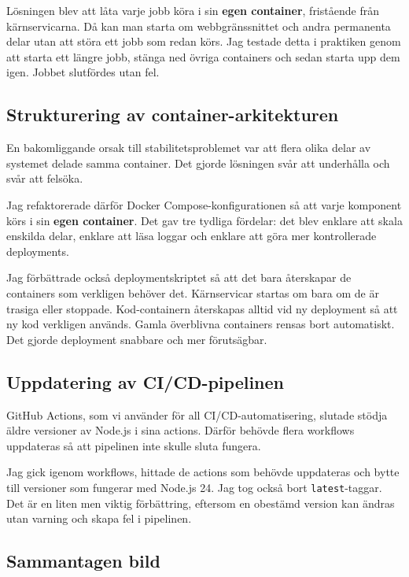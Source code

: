 Lösningen blev att låta varje jobb köra i sin \textbf{egen container}, fristående från
kärnservicarna. Då kan man starta om webbgränssnittet och andra permanenta delar utan att
störa ett jobb som redan körs. Jag testade detta i praktiken genom att starta ett längre jobb,
stänga ned övriga containers och sedan starta upp dem igen. Jobbet slutfördes utan fel.

\subsection{Strukturering av container-arkitekturen}
\label{subsec:compose}

En bakomliggande orsak till stabilitetsproblemet var att flera olika delar av systemet delade
samma container. Det gjorde lösningen svår att underhålla och svår att felsöka.

Jag refaktorerade därför Docker Compose-konfigurationen så att varje komponent körs i sin
\textbf{egen container}. Det gav tre tydliga fördelar: det blev enklare att skala enskilda delar,
enklare att läsa loggar och enklare att göra mer kontrollerade deployments.

Jag förbättrade också deploymentskriptet så att det bara återskapar de containers som verkligen
behöver det. Kärnservicar startas om bara om de är trasiga eller stoppade. Kod-containern
återskapas alltid vid ny deployment så att ny kod verkligen används. Gamla överblivna
containers rensas bort automatiskt. Det gjorde deployment snabbare och mer förutsägbar.

\subsection{Uppdatering av CI/CD-pipelinen}
\label{subsec:cicd}

GitHub Actions, som vi använder för all CI/CD-automatisering, slutade stödja äldre versioner
av Node.js i sina actions. Därför behövde flera workflows uppdateras så att pipelinen inte
skulle sluta fungera.

Jag gick igenom workflows, hittade de actions som behövde uppdateras och bytte till versioner
som fungerar med Node.js 24. Jag tog också bort \texttt{latest}-taggar. Det är en liten men
viktig förbättring, eftersom en obestämd version kan ändras utan varning och skapa fel i
pipelinen.

\subsection*{Sammantagen bild}

